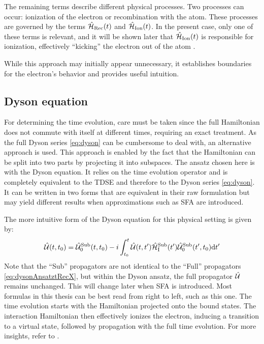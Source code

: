The remaining terms describe different physical processes.
Two processes can occur: ionization of the electron or recombination with the atom.
These processes are governed by the terms $\hat{\mathcal{H}}_{\mathrm{Rec}}(t)$ and $\hat{\mathcal{H}}_{\mathrm{Ion}}(t)$.
In the present case, only one of these terms is relevant, and it will be shown later that $\hat{\mathcal{H}}_{\mathrm{Ion}}(t)$ is responsible for ionization, effectively ``kicking'' the electron out of the atom \cite{Ivanov20012005}.

While this approach may initially appear unnecessary, it establishes boundaries for the electron's behavior and provides useful intuition.










\subsection{Dyson equation}
For determining the time evolution, care must be taken since the full Hamiltonian does not commute with itself at different times, requiring an exact treatment.
As the full Dyson series \eqref{eq:dyson} can be cumbersome to deal with, an alternative approach is used.
This approach is enabled by the fact that the Hamiltonian can be split into two parts by projecting it into subspaces.
The ansatz chosen here is with the Dyson equation.
It relies on the time evolution operator and is completely equivalent to the TDSE and therefore to the Dyson series \eqref{eq:dyson}.
It can be written in two forms that are equivalent in their raw formulation but may yield different results when approximations such as SFA are introduced.\

The more intuitive form of the Dyson equation for this physical setting is given by:
\begin{equation}
    \hat{\mathcal{U}}(t,t_0)=\hat{\mathcal{U}}^{\mathrm{Sub}}_0(t,t_0)-i\int_{t_0}^{t} \hat{\mathcal{U}}(t,t')\hat{\mathcal{H}}^{\mathrm{Sub}}_{\mathrm{I}}(t')\hat{\mathcal{U}}^{\mathrm{Sub}}_0(t',t_0) \mathrm{d} t'       \label{eq:dysonAnsatzODE}
\end{equation}
Note that the ``Sub'' propagators are not identical to the ``Full'' propagators \eqref{eq:dysonAnsatztRecX}, but within the Dyson ansatz, the full propagator $\hat{\mathcal{U}}$ remains unchanged.
This will change later when SFA is introduced.
Most formulas in this thesis can be best read from right to left, such as this one.
The time evolution starts with the Hamiltonian projected onto the bound states.
The interaction Hamiltonian then effectively ionizes the electron, inducing a transition to a virtual state, followed by propagation with the full time evolution. 
For more insights, refer to \cite{Ivanov20012005}.

